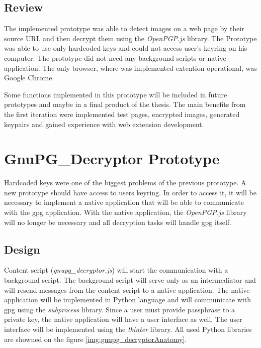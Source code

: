 \subsection{Review}
The implemented prototype was able to detect images on a web page by their source URL and then decrypt them using the \textit{OpenPGP.js} library. The Prototype was able to use only hardcoded keys and could not access user's keyring on his computer. The prototype did not need any background scripts or native application. The only browser, where was implemented extention operational, was Google Chrome.

Some functions implemented in this prototype will be included in future prototypes and maybe in a final product of the thesis. The main benefits from the first iteration were implemented test pages, encrypted images, generated keypairs and gained experience with web extension development.

\section{GnuPG\_Decryptor Prototype}
\label{prototype:GnuPG_Decryptor}
Hardcoded keys were one of the biggest problems of the previous prototype. A new prototype should have access to users keyring. In order to access it, it will be necessary to implement a native application that will be able to communicate with the gpg application. With the native application, the \textit{OpenPGP.js} library will no longer be necessary and all decryption tasks will handle gpg itself.

\subsection{Design}
Content script (\textit{gnupg\_decryptor.js}) will start the communication with a background script. The background script will serve only as an intermediator and will resend messages from the content script to a native application. The native application will be implemented in Python language and will communicate with gpg using the \textit{subprocess} library. Since a user must provide passphrase to a private key, the native application will have a user interface as well. The user interface will be implemented using the \textit{tkinter} library. All used Python libraries are showned on the figure \ref{img:gnupg_decryptorAnatomy}.

